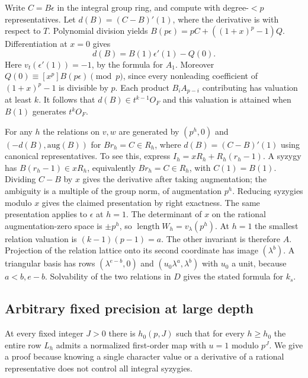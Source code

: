 \documentclass[11pt]{article}
\newcommand{\len}{\operatorname{length}}
\begin{document}
Write $C=B\epsilon$ in the integral group ring, and compute with
degree-$<p$ representatives. Let $d(B)=(C-B)'(1)$, where the derivative
is with respect to $T$. Polynomial division yields
$B(p\epsilon)=pC+((1+x)^p-1)Q$. Differentiation at $x=0$ gives
\[
 d(B)=B(1)\epsilon'(1)-Q(0).
\]
Here $v_t(\epsilon'(1))=-1$, by the formula for $A_1$. Moreover
$Q(0)\equiv[x^p] B(p\epsilon)\pmod p$, since every nonleading
coefficient of $(1+x)^p-1$ is divisible by $p$. Each product
$B_iA_{p-i}$ contributing has valuation at least $k$. It follows that
$d(B)\in t^{k-1}O_F$ and this valuation is attained when $B(1)$
generates $t^kO_F$.

For any $h$ the relations on $v,w$ are generated by
$(p^h,0)$ and $(-d(B),\mathrm{aug}(B))$ for $Br_h=C\in R_h$,
where $d(B)=(C-B)'(1)$ using canonical representatives. To see
this, express $I_h=xR_h+R_h(r_h-1)$. A syzygy has
$B(r_h-1)\in xR_h$, equivalently $Br_h=C\in R_h$, with
$C(1)=B(1)$. Dividing $C-B$ by $x$ gives the derivative after taking
augmentation; the ambiguity is a multiple of the group norm, of
augmentation $p^h$. Reducing syzygies modulo $x$ gives the claimed
presentation by right exactness. The same presentation applies to
$\epsilon$ at $h=1$. The determinant of $x$ on the rational
augmentation-zero space is $\pm p^h$, so $\len W_h=v_\lambda(p^h)$.
At $h=1$ the smallest relation valuation is $(k-1)(p-1)=a$.
The other invariant is therefore $A$. Projection of the relation
lattice onto its second coordinate has image $(\lambda^b)$. A triangular
basis has rows $(\lambda^{e-b},0)$ and $(u_0\lambda^a,\lambda^b)$
with $u_0$ a unit, because $a<b,e-b$. Solvability of the two
relations in $D$ gives the stated formula for $k_s$.

\subsection{Arbitrary fixed precision at large depth}
At every fixed integer $J>0$ there is $h_0(p,J)$ such that for every
$h\ge h_0$ the entire row $L_h$ admits a normalized first-order map
with $u=1$ modulo $p^J$. We give a proof because knowing a single
character value or a derivative of a rational representative does not
control all integral syzygies.
\end{document}

